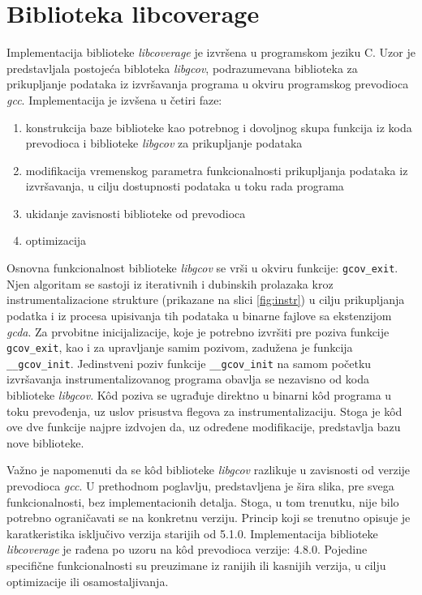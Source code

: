 \documentclass[12pt,oneside]{memoir}
\newcommand{\kod}[1]{\texttt{#1}}
\newcommand{\strano}[1]{\textit{#1}}
\begin{document}
\section{Biblioteka libcoverage}

Implementacija biblioteke \strano{libcoverage} je izvršena u programskom jeziku C. Uzor je predstavljala postojeća bibloteka \strano{libgcov}, podrazumevana biblioteka za prikupljanje podataka iz izvršavanja programa u okviru programskog prevodioca \strano{gcc}. Implementacija je izvšena u četiri faze:
\begin{enumerate}
\item konstrukcija baze biblioteke kao potrebnog i dovoljnog skupa funkcija iz koda prevodioca i biblioteke \strano{libgcov} za prikupljanje podataka
\item modifikacija vremenskog parametra funkcionalnosti prikupljanja podataka iz izvršavanja, u cilju dostupnosti podataka u toku rada programa
\item ukidanje zavisnosti biblioteke od prevodioca
\item optimizacija
\end{enumerate}


Osnovna funkcionalnost biblioteke \strano{libgcov} se vrši u okviru funkcije: \kod{gcov\_exit}. Njen algoritam se sastoji iz iterativnih i dubinskih prolazaka kroz instrumentalizacione strukture (prikazane na slici \ref{fig:instr}) u cilju prikupljanja podatka i iz procesa upisivanja tih podataka u binarne fajlove sa ekstenzijom \strano{gcda}. Za prvobitne inicijalizacije, koje je potrebno izvršiti pre poziva funkcije \kod{gcov\_exit}, kao i za upravljanje samim pozivom, zadužena je funkcija \kod{\_\_gcov\_init}. Jedinstveni poziv funkcije \kod{\_\_gcov\_init} na samom početku izvršavanja instrumentalizovanog programa obavlja se nezavisno od koda biblioteke \strano{libgcov}. K\^{o}d poziva se ugrađuje direktno u binarni k\^{o}d programa u toku prevođenja, uz uslov prisustva flegova za instrumentalizaciju. Stoga je k\^{o}d ove dve funkcije najpre izdvojen da, uz određene modifikacije, predstavlja bazu nove biblioteke. 

Važno je napomenuti da se k\^{o}d biblioteke \strano{libgcov} razlikuje u zavisnosti od verzije prevodioca \strano{gcc}. U prethodnom poglavlju, predstavljena je šira slika, pre svega funkcionalnosti, bez implementacionih detalja. Stoga, u tom trenutku, nije bilo potrebno ograničavati se na konkretnu verziju. Princip koji se trenutno opisuje je karatkeristika isključivo verzija starijih od 5.1.0. Implementacija biblioteke \strano{libcoverage} je rađena po uzoru na k\^{o}d prevodioca verzije: 4.8.0. Pojedine specifične funkcionalnosti su preuzimane iz ranijih ili kasnijih verzija, u cilju optimizacije ili osamostaljivanja. 
\end{document}

